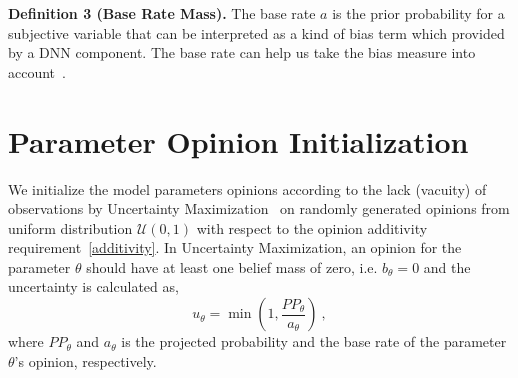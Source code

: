 \vspace{.2cm}
\noindent\textbf{Definition 3 (Base Rate Mass).} The base rate $a$ is the prior probability for a subjective variable that can be interpreted as a kind of bias term which provided by a DNN component. The base rate can help us take the bias measure into account~\cite{sl}. %

{\color{red} \section{Parameter Opinion Initialization}
\label{parint_app}
We initialize the model parameters opinions according to the lack (vacuity) of observations by Uncertainty Maximization~\cite{sl} on randomly generated opinions from uniform distribution $\mathcal{U}(0,1)$ with respect to the opinion additivity requirement~\ref{additivity}. In Uncertainty Maximization, an opinion for the parameter $\theta$ should have at least one belief mass of zero, i.e. $b_{\theta} = 0$ and the uncertainty is calculated as,
\begin{equation}
    u_{\theta} = \min(1,\frac{PP_{\theta}}{a_{\theta}})\ ,
\end{equation}
where $PP_{\theta}$ and $a_{\theta}$ is the projected probability and the base rate of the parameter $\theta$'s opinion, respectively.}

